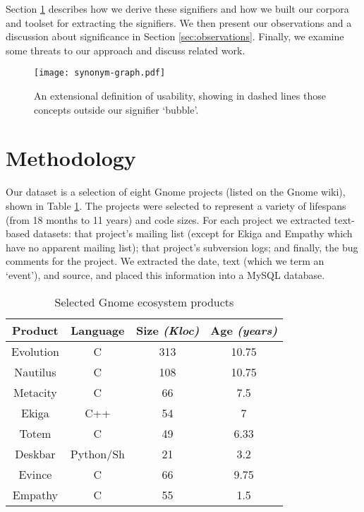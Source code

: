 \documentclass[conference, compsoc]{IEEEtran}
\begin{document}
Section \ref{sec:Method} describes how we derive these signifiers and how we built our corpora and toolset for extracting the signifiers. We then present our observations and a discussion about significance in Section \ref{sec:observations}. Finally, we examine some threats to our approach and discuss related work. 

\begin{figure}[b]
\centering
\texttt{[image: synonym-graph.pdf]}
\caption{An extensional definition of usability, showing in dashed lines those concepts outside our signifier `bubble'.}
\label{fig:syngraph}
\end{figure}
	
\section{Methodology}
\label{sec:Method}
Our dataset is a selection of eight Gnome projects (listed on the Gnome wiki), shown in Table \ref{tbl:projects}. The projects were selected to represent a variety of lifespans (from 18 months to 11 years) and code sizes. For each project we extracted text-based datasets: that project's mailing list (except for Ekiga and Empathy which have no apparent mailing list); that project's subversion logs; and finally, the bug comments for the project. We extracted the date, text (which we term an `event'), and source, and placed this information into a MySQL database.

\begin{table}
	\caption{Selected Gnome ecosystem products}
	\centering
	\label{tbl:projects}
\begin{tabular}{|c|c|c|c|}
\hline
\rowcolor[gray]{.9} 
\textbf{Product} & \textbf{Language} & \textbf{Size} \emph{(Kloc)} & \textbf{Age} \emph{(years)} \\
\hline
\hline 
Evolution & C & 313 & 10.75\\ \hline
Nautilus & C & 108 & 10.75  \\ \hline
Metacity & C & 66 & 7.5  \\ \hline
Ekiga & C++ & 54 & 7  \\ \hline
Totem & C & 49 & 6.33  \\ \hline
Deskbar & Python/Sh & 21 & 3.2  \\ \hline
Evince & C & 66 & 9.75\\ \hline
Empathy &C & 55 & 1.5\\ 
\hline
\end{tabular}
\end{table}
\end{document}

